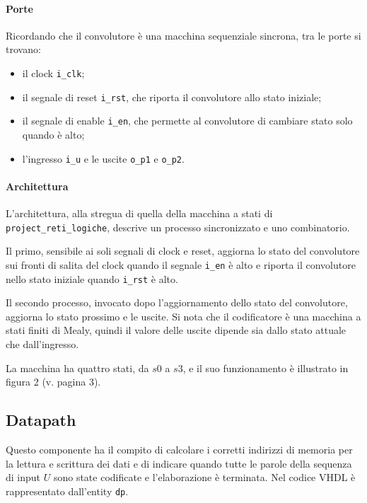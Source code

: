 \documentclass{article}
\begin{document}
			\paragraph{Porte}
			Ricordando che il convolutore è una macchina sequenziale sincrona, tra le porte si
			trovano:

			\begin{itemize}
				\item il clock \verb|i_clk|;
				\item il segnale di reset \verb|i_rst|, che riporta il convolutore allo stato
					iniziale;
				\item il segnale di enable \verb|i_en|, che permette al convolutore di cambiare
					stato solo quando è alto;
				\item l'ingresso \verb|i_u| e le uscite \verb|o_p1| e \verb|o_p2|.
			\end{itemize}

			\paragraph{Architettura}
			L'architettura, alla stregua di quella della macchina a stati di
			\verb|project_reti_logiche|, descrive un processo sincronizzato e uno combinatorio.

			Il primo, sensibile ai soli segnali di clock e reset, aggiorna lo stato del
			convolutore sui fronti di salita del clock quando il segnale \verb|i_en|
			è alto e riporta il convolutore nello stato iniziale quando \verb|i_rst| è alto.

			Il secondo processo, invocato dopo l'aggiornamento dello stato del convolutore,
			aggiorna lo stato prossimo e le uscite. Si nota che il codificatore è una macchina a
			stati finiti di Mealy, quindi il valore delle uscite dipende sia dallo stato attuale
			che dall'ingresso.

			La macchina ha quattro stati, da $s0$ a $s3$, e il suo funzionamento è illustrato in
			figura 2 (v. pagina 3).

		\subsection{Datapath}
			Questo componente ha il compito di calcolare i corretti indirizzi di memoria per la
			lettura e scrittura dei dati e di indicare quando tutte le parole della sequenza di
			input $U$ sono state codificate e l'elaborazione è terminata. Nel codice VHDL è
			rappresentato dall'entity \verb|dp|.
\end{document}
